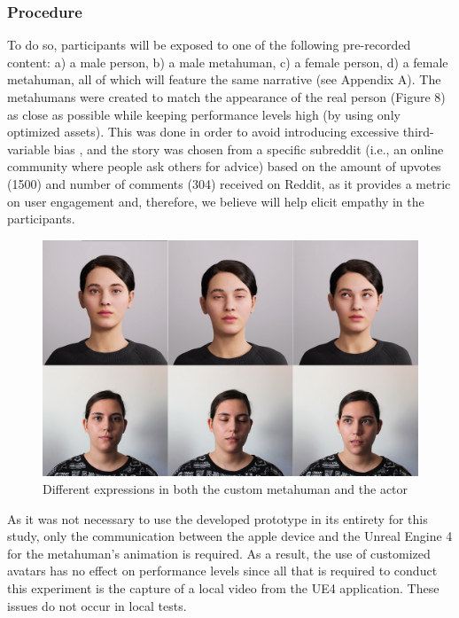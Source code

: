 \subsubsection{Procedure}
To do so, participants will be exposed to one of the following pre-recorded content: a) a male person, b) a male metahuman, c) a female person, d) a female metahuman, all of which will feature the same narrative (see Appendix A). The metahumans were created to match the appearance of the real person (Figure 8) as close as possible while keeping performance levels high (by using only optimized assets). This was done in order to avoid introducing excessive third-variable bias \cite{ROT19}, and the story was chosen from a specific subreddit (i.e., an online community where people ask others for advice) based on the amount of upvotes (1500) and number of comments (304) received on Reddit, as it provides a metric on user engagement and, therefore, we believe will help elicit empathy in the participants.


\begin{figure}[h!]
\includegraphics[width=\textwidth]{figures/personavatar.jpg}
\centering
\caption{Different expressions in both the custom metahuman and the actor}
\end{figure}

As it was not necessary to use the developed prototype in its entirety for this study, only the communication between the apple device and the Unreal Engine 4 for the metahuman's animation is required. As a result, the use of customized avatars has no effect on performance levels since all that is required to conduct this experiment is the capture of a local video from the UE4 application. These issues do not occur in local tests.

